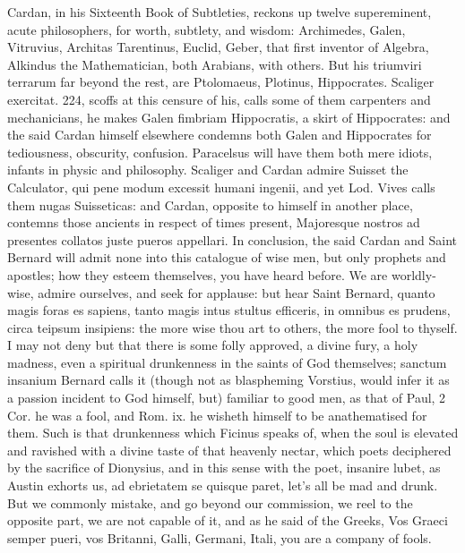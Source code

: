 {Cardan, in his Sixteenth Book of Subtleties, reckons up twelve
supereminent, acute philosophers, for worth, subtlety, and wisdom:
Archimedes, Galen, Vitruvius, Architas Tarentinus, Euclid, Geber, that
first inventor of Algebra, Alkindus the Mathematician, both Arabians,
with others. But his triumviri terrarum far beyond the rest, are
Ptolomaeus, Plotinus, Hippocrates. Scaliger exercitat. 224, scoffs at
this censure of his, calls some of them carpenters and mechanicians, he
makes Galen fimbriam Hippocratis, a skirt of Hippocrates: and the said
Cardan himself elsewhere condemns both Galen and Hippocrates for
tediousness, obscurity, confusion. Paracelsus will have them both mere
idiots, infants in physic and philosophy. Scaliger and Cardan admire
Suisset the Calculator, qui pene modum excessit humani ingenii, and yet
Lod. Vives calls them nugas Suisseticas: and Cardan, opposite to
himself in another place, contemns those ancients in respect of times
present, Majoresque nostros ad presentes collatos juste pueros
appellari. In conclusion, the said Cardan and Saint Bernard will
admit none into this catalogue of wise men, but only prophets and
apostles; how they esteem themselves, you have heard before. We are
worldly-wise, admire ourselves, and seek for applause: but hear Saint
Bernard, quanto magis foras es sapiens, tanto magis intus stultus
efficeris, \etc{} in omnibus es prudens, circa teipsum insipiens: the more
wise thou art to others, the more fool to thyself. I may not deny but
that there is some folly approved, a divine fury, a holy madness, even
a spiritual drunkenness in the saints of God themselves; sanctum
insanium Bernard calls it (though not as blaspheming Vorstius,
would infer it as a passion incident to God himself, but) familiar to
good men, as that of Paul, 2 Cor. he was a fool, \etc{} and Rom. ix. he
wisheth himself to be anathematised for them. Such is that drunkenness
which Ficinus speaks of, when the soul is elevated and ravished with a
divine taste of that heavenly nectar, which poets deciphered by the
sacrifice of Dionysius, and in this sense with the poet, insanire
lubet, as Austin exhorts us, ad ebrietatem se quisque paret, let's all
be mad and drunk. But we commonly mistake, and go beyond our
commission, we reel to the opposite part, we are not capable of
it, and as he said of the Greeks, Vos Graeci semper pueri, vos
Britanni, Galli, Germani, Itali, \etc{} you are a company of fools.

}
